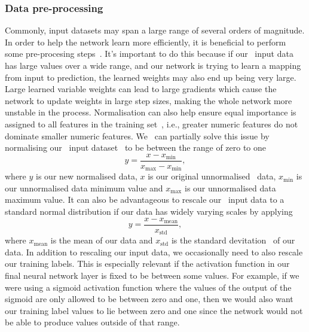 \subsubsection{Data pre-processing}
%
Commonly, input datasets may span a large  range of several orders of magnitude. In order to help the network learn more efficiently, it is beneficial to perform some pre-procesing steps~\cite{589532}. It's important to do this because if our~ input data has large values over a wide range, and our network is trying to learn a mapping from input to prediction, the learned weights may also end up being very large. Large learned variable weights can lead to large gradients which cause the network to update weights in large step sizes, making the whole network more unstable in the process. Normalisation can also help ensure equal importance is assigned to all features in the training set~\cite{SINGH2020105524}, i.e., greater numeric features do not dominate smaller numeric features. We~ can partially solve this issue by normalising our~ input dataset~ to be between the range of zero to one~ 
\begin{equation}
    y = \frac{x - x_{\textrm{min}}}{x_{\textrm{max}}-x_{\textrm{min}}},
\end{equation}
where $y$ is our new normalised data, $x$ is our original unnormalised~ data, $x_{\textrm{min}}$ is our unnormalised data minimum value and $x_{\textrm{max}}$ is our unnormalised data maximum value. It can also be advantageous to rescale our~ input data to a standard normal distribution if our data has widely varying scales by applying 
\begin{equation}
    y = \frac{x - x_{\textrm{mean}}}{x_{\textrm{std}}},
\end{equation}
where $x_{\textrm{mean}}$ is the mean of our data and $x_{\textrm{std}}$ is the standard devitation~ of our data. In addition to rescaling our input data, we occasionally need to also rescale our training labels. This is especially relevant if the activation function in our final neural network layer is fixed to be between some values. For example, if we were using a sigmoid activation function where the values of the output of the sigmoid are only allowed to be between zero and one, then we would also want our training label values to lie between zero and one since the network would not be able to produce values outside of that range.~

